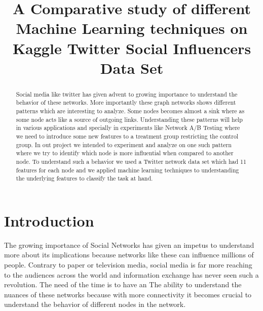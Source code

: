 \documentclass[conference]{IEEEtran}
\numberwithin{equation}{section}
\numberwithin{figure}{section}
\numberwithin{table}{section}
\begin{document}
%
\title{A Comparative study of different Machine Learning techniques on Kaggle Twitter Social Influencers Data Set}
\author{
}
\maketitle


\begin{abstract}
Social media like twitter has given advent to growing importance to understand the behavior of these networks. More importantly these graph networks shows different patterns which are interesting to analyze. Some nodes becomes almost a sink where as some node acts like a source of outgoing links. Understanding these patterns will help in various applications and specially in experiments like Network A/B Testing where we need to introduce some new features to a treatment group restricting the control group. In out project we intended to experiment and analyze on one such pattern where we try to identify which node is more influential when compared to another node. To understand such a behavior we used a Twitter network data set which had 11 features for each node and we applied machine learning techniques to understanding the underlying features to classify the task at hand.
 
\end{abstract}

\section{Introduction}
The growing importance of Social Networks has given an impetus to understand more about its implications because networks like these can influence millions of people. Contrary to paper or television media, social media is far more reaching to the audiences across the world and information exchange has never seen such a revolution. The need of the time is to have an The ability to understand the nuances of these networks because with more connectivity it becomes crucial to understand the behavior of different nodes in the network.
\end{document}
